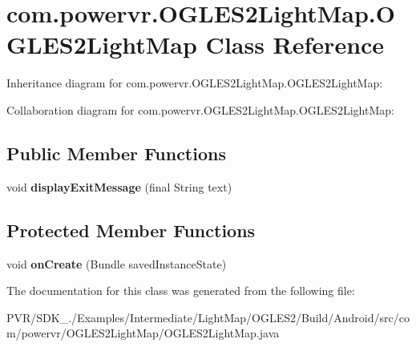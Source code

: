 \hypertarget{classcom_1_1powervr_1_1_o_g_l_e_s2_light_map_1_1_o_g_l_e_s2_light_map}{\section{com.\+powervr.\+O\+G\+L\+E\+S2\+Light\+Map.\+O\+G\+L\+E\+S2\+Light\+Map Class Reference}
\label{classcom_1_1powervr_1_1_o_g_l_e_s2_light_map_1_1_o_g_l_e_s2_light_map}
}


Inheritance diagram for com.\+powervr.\+O\+G\+L\+E\+S2\+Light\+Map.\+O\+G\+L\+E\+S2\+Light\+Map\+:


Collaboration diagram for com.\+powervr.\+O\+G\+L\+E\+S2\+Light\+Map.\+O\+G\+L\+E\+S2\+Light\+Map\+:
\subsection*{Public Member Functions}
\begin{DoxyCompactItemize}
\item 
\hypertarget{classcom_1_1powervr_1_1_o_g_l_e_s2_light_map_1_1_o_g_l_e_s2_light_map_a0557193db7c6e9dbebf37ba13d4771cd}{void {\bfseries display\+Exit\+Message} (final String text)}\label{classcom_1_1powervr_1_1_o_g_l_e_s2_light_map_1_1_o_g_l_e_s2_light_map_a0557193db7c6e9dbebf37ba13d4771cd}

\end{DoxyCompactItemize}
\subsection*{Protected Member Functions}
\begin{DoxyCompactItemize}
\item 
\hypertarget{classcom_1_1powervr_1_1_o_g_l_e_s2_light_map_1_1_o_g_l_e_s2_light_map_a4eed33542542bf257705010dcbbbfcf6}{void {\bfseries on\+Create} (Bundle saved\+Instance\+State)}\label{classcom_1_1powervr_1_1_o_g_l_e_s2_light_map_1_1_o_g_l_e_s2_light_map_a4eed33542542bf257705010dcbbbfcf6}

\end{DoxyCompactItemize}


The documentation for this class was generated from the following file\+:\begin{DoxyCompactItemize}
\item 
P\+V\+R/\+S\+D\+K\+\_./\+Examples/\+Intermediate/\+Light\+Map/\+O\+G\+L\+E\+S2/\+Build/\+Android/src/com/powervr/\+O\+G\+L\+E\+S2\+Light\+Map/O\+G\+L\+E\+S2\+Light\+Map.\+java\end{DoxyCompactItemize}
